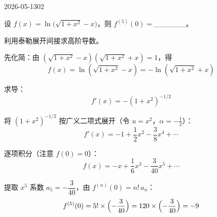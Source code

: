 \begin{mistake}{2026-05-13}{02}

\begin{problemcontent}
设 \(f(x) = \ln\!\bigl(\sqrt{1+x^{2}}-x\bigr)\)，则 \(f^{(5)}(0) = \)\_\_\_\_\_\_。
\end{problemcontent}

\begin{solutioncontent}
利用泰勒展开间接求高阶导数。

先化简：由 \((\sqrt{1+x^{2}}-x)(\sqrt{1+x^{2}}+x)=1\)，得
\[
f(x)=\ln(\sqrt{1+x^{2}}-x)=-\ln(\sqrt{1+x^{2}}+x)
\]

求导：
\[
f'(x)=-(1+x^{2})^{-1/2}
\]

将 \((1+x^{2})^{-1/2}\) 按广义二项式展开（令 \(u=x^{2}\)，\(\alpha=-\tfrac{1}{2}\)）：
\[
f'(x)=-1+\frac{1}{2}x^{2}-\frac{3}{8}x^{4}+\cdots
\]

逐项积分（注意 \(f(0)=0\)）：
\[
f(x)=-x+\frac{1}{6}x^{3}-\frac{3}{40}x^{5}+\cdots
\]

提取 \(x^{5}\) 系数 \(a_{5}=-\dfrac{3}{40}\)，由 \(f^{(n)}(0)=n!\,a_{n}\)：
\[
f^{(5)}(0)=5!\times\Bigl(-\frac{3}{40}\Bigr)=120\times\Bigl(-\frac{3}{40}\Bigr)=-9
\]
\end{solutioncontent}

\end{mistake}

